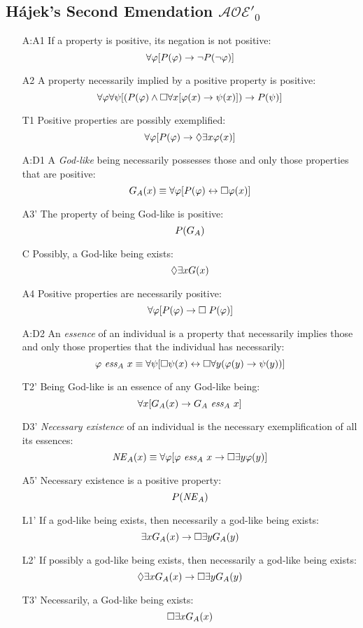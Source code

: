 \documentclass{birkjour}
\newcommand{\AOEHH}{$\mathcal{AOE}'_0$}
\theoremstyle{definition}
\theoremstyle{remark}
\numberwithin{equation}{section}
\begin{document}
\begin{appendix}
\section{Hájek's Second Emendation \AOEHH} \label{apx:Hajek2}

\begin{itemize}
\item[A:A1] If a property is positive, its negation is not positive:
  $$\forall \varphi [P(\varphi) \rightarrow \neg P(\neg \varphi)]$$ 
\item[A2] A property necessarily implied by a
  positive property is positive:
  $$\forall \varphi \forall \psi [(P(\varphi) \wedge \Box \forall x [\varphi(x)
  \rightarrow \psi(x)]) \rightarrow P(\psi)]$$
\item[T1] Positive properties are possibly exemplified: 
  $$\forall \varphi [P(\varphi) \rightarrow \Diamond \exists x \varphi(x)]$$ 
\item[A:D1] A \emph{God-like} being necessarily possesses those and only those properties that are positive: 
  $$G_A(x) \equiv \forall \varphi [P(\varphi) \leftrightarrow \Box \varphi(x)]$$ 
\item[A3']  The property of being God-like is positive: 
  $$P(G_A)$$
\item[C\phantom{1}] Possibly, a God-like being exists: $$\Diamond \exists x G(x)$$
\item[A4]  Positive properties are necessarily positive: 
  $$\forall \varphi [P(\varphi) \rightarrow \Box \; P(\varphi)]$$ 
\item[A:D2] An \emph{essence} of an individual is a property that necessarily implies those and only those properties that the individual has necessarily: $$\varphi \ \mathit{ess}_A \ x \equiv \forall
  \psi [\Box \psi(x) \leftrightarrow \Box \forall y (\varphi(y) \rightarrow \psi(y))]$$ 
\item[T2']  Being God-like is an essence of any
  God-like being: $$\forall x [G_A(x) \rightarrow G_A \ \mathit{ess}_A \ x]$$
\item[D3'] \emph{Necessary existence} of an individual is the necessary exemplification of all its essences: 
  $$\mathit{NE}_A(x) \equiv \forall \varphi [\varphi \ \mathit{ess}_A \ x \rightarrow \Box
  \exists y \varphi(y)]$$
\item[A5'] Necessary existence is a positive property: $$P(\mathit{NE}_A)$$ 
\item[L1'] If a god-like being exists, then necessarily a god-like being exists: 
  $$\exists x G_A(x) \rightarrow \Box \exists y G_A(y)$$
\item[L2'] If possibly a god-like being exists, then necessarily a god-like being exists: 
  $$\Diamond \exists x G_A(x) \rightarrow \Box \exists y G_A(y) $$
%
\item[T3'] Necessarily, a God-like being exists: $$\Box \exists x G_A(x)$$ 
\end{itemize}



\end{appendix}
\end{document}
